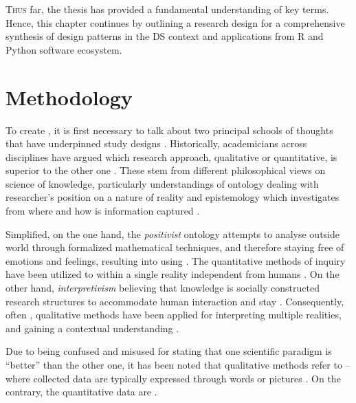 \lettrine[lines=2]{\color{BrickRed}T}{hus} far, the thesis has provided a fundamental understanding of key terms.
Hence, this chapter continues by outlining a research design for a comprehensive synthesis of design patterns in the \ac{DS} context and applications from R and Python software ecosystem.

\section{Methodology}
\label{outliningMethod}
To create , it is first necessary to talk about two principal schools of thoughts that have underpinned study designs \parencites{PasianBeverly2015}{Creswell2003}.
Historically, academicians across disciplines have argued which research approach, qualitative or quantitative, is superior to the other one \parencite{SmallMario20111}. 
These stem from different philosophical views on science of knowledge, particularly understandings of ontology dealing with researcher's position on a nature of reality and epistemology which investigates from where and how is information captured \parencites{Carson2001}{PasianBeverly2015}.

Simplified, on the one hand, the \emph{positivist} ontology attempts to analyse outside world through formalized mathematical techniques, and therefore staying free of emotions and feelings, resulting into using  \parencite{Prabash78}. 
The quantitative methods of inquiry have been utilized to  within a single reality independent from humans \parencites{SmallMario20111}{Carson2001}.
On the other hand, \emph{interpretivism} believing that knowledge is socially constructed  research structures to accommodate human interaction and stay  \parencite{Prabash78}.
Consequently, often , qualitative methods have been applied for interpreting multiple realities,  and gaining a contextual understanding \parencites[558]{SeamanC1999}{SmallMario20111}{Carson2001}.

Due to being confused and misused for stating that one scientific paradigm is \enquote{better} than the other one, it has been noted that qualitative methods refer to  -- where collected data are typically expressed through words or pictures \parencites[17]{CorbinStrauss1990}{Gorard2010}{Carson2001}. 
On the contrary, the quantitative data are  \parencite[563]{SeamanC1999}.

